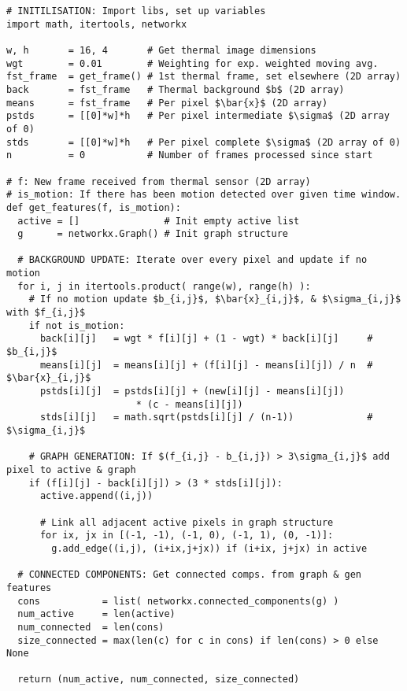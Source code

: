 \begin{verbatim}
# INITILISATION: Import libs, set up variables
import math, itertools, networkx

w, h       = 16, 4       # Get thermal image dimensions
wgt        = 0.01        # Weighting for exp. weighted moving avg.
fst_frame  = get_frame() # 1st thermal frame, set elsewhere (2D array)
back       = fst_frame   # Thermal background $b$ (2D array)
means      = fst_frame   # Per pixel $\bar{x}$ (2D array)
pstds      = [[0]*w]*h   # Per pixel intermediate $\sigma$ (2D array of 0) 
stds       = [[0]*w]*h   # Per pixel complete $\sigma$ (2D array of 0)
n          = 0           # Number of frames processed since start

# f: New frame received from thermal sensor (2D array)
# is_motion: If there has been motion detected over given time window.
def get_features(f, is_motion):
  active = []               # Init empty active list
  g      = networkx.Graph() # Init graph structure

  # BACKGROUND UPDATE: Iterate over every pixel and update if no motion
  for i, j in itertools.product( range(w), range(h) ):
    # If no motion update $b_{i,j}$, $\bar{x}_{i,j}$, & $\sigma_{i,j}$  with $f_{i,j}$  
    if not is_motion:
      back[i][j]   = wgt * f[i][j] + (1 - wgt) * back[i][j]     # $b_{i,j}$
      means[i][j]  = means[i][j] + (f[i][j] - means[i][j]) / n  # $\bar{x}_{i,j}$
      pstds[i][j]  = pstds[i][j] + (new[i][j] - means[i][j])
                       * (c - means[i][j])
      stds[i][j]   = math.sqrt(pstds[i][j] / (n-1))             # $\sigma_{i,j}$
        
    # GRAPH GENERATION: If $(f_{i,j} - b_{i,j}) > 3\sigma_{i,j}$ add pixel to active & graph
    if (f[i][j] - back[i][j]) > (3 * stds[i][j]):
      active.append((i,j))

      # Link all adjacent active pixels in graph structure
      for ix, jx in [(-1, -1), (-1, 0), (-1, 1), (0, -1)]:
        g.add_edge((i,j), (i+ix,j+jx)) if (i+ix, j+jx) in active

  # CONNECTED COMPONENTS: Get connected comps. from graph & gen features
  cons           = list( networkx.connected_components(g) )
  num_active     = len(active)
  num_connected  = len(cons)
  size_connected = max(len(c) for c in cons) if len(cons) > 0 else None

  return (num_active, num_connected, size_connected)
\end{verbatim}